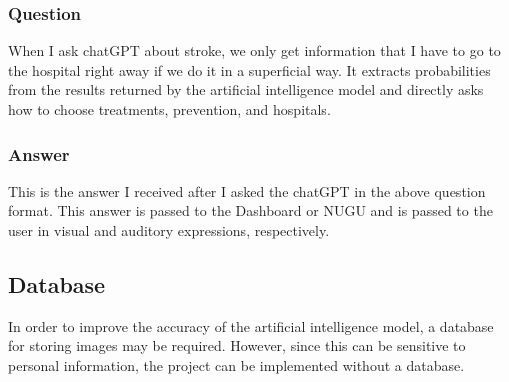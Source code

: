 \subsubsection{Question}
When I ask chatGPT about stroke, we only get information that I have to go to the hospital right away if we do it in a superficial way. It extracts probabilities from the results returned by the artificial intelligence model and directly asks how to choose treatments, prevention, and hospitals.
\subsubsection{Answer}
This is the answer I received after I asked the chatGPT in the above question format. This answer is passed to the Dashboard or NUGU and is passed to the user in visual and auditory expressions, respectively.

\subsection{Database}
In order to improve the accuracy of the artificial intelligence model, a database for storing images may be required. However, since this can be sensitive to personal information, the project can be implemented without a database.
